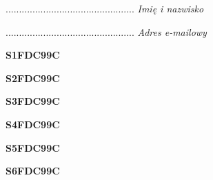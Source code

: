 \begin{turn}{90}\begin{minipage}{\linewidth} \vspace{20mm} ................................................  \textit{Imię i nazwisko}\end{minipage}\end{turn}

\begin{turn}{90}\begin{minipage}{\linewidth} \vspace{20mm} ................................................  \textit{Adres e-mailowy}\end{minipage}\end{turn}

\begin{turn}{90}\huge \begin{minipage}{\linewidth} \vspace{10mm}\textbf{S1FDC99C}\end{minipage}\end{turn}

\begin{turn}{90}\huge \begin{minipage}{\linewidth} \vspace{10mm}\textbf{S2FDC99C}\end{minipage}\end{turn}

\begin{turn}{90}\huge \begin{minipage}{\linewidth} \vspace{10mm}\textbf{S3FDC99C}\end{minipage}\end{turn}

\begin{turn}{90}\huge \begin{minipage}{\linewidth} \vspace{10mm}\textbf{S4FDC99C}\end{minipage}\end{turn}

\begin{turn}{90}\huge \begin{minipage}{\linewidth} \vspace{10mm}\textbf{S5FDC99C}\end{minipage}\end{turn}

\begin{turn}{90}\huge \begin{minipage}{\linewidth} \vspace{10mm}\textbf{S6FDC99C}\end{minipage}\end{turn}

